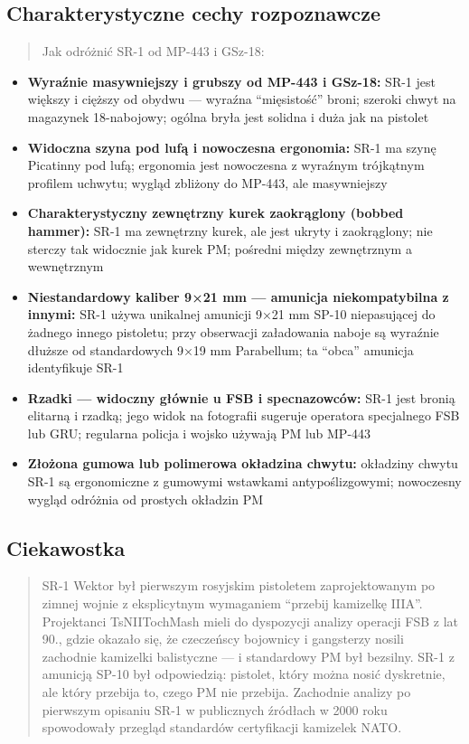 \documentclass[12pt,oneside]{book}
\providecommand{\tightlist}{%
  \setlength{\itemsep}{0pt}\setlength{\parskip}{0pt}}
\begin{document}
\subsection{Charakterystyczne cechy
rozpoznawcze}\label{charakterystyczne-cechy-rozpoznawcze-108}

\begin{quote}
Jak odróżnić SR-1 od MP-443 i GSz-18:
\end{quote}

\begin{itemize}
\tightlist
\item
  \textbf{Wyraźnie masywniejszy i grubszy od MP-443 i GSz-18:} SR-1 jest
  większy i cięższy od obydwu --- wyraźna ``mięsistość'' broni; szeroki
  chwyt na magazynek 18-nabojowy; ogólna bryła jest solidna i duża jak
  na pistolet
\item
  \textbf{Widoczna szyna pod lufą i nowoczesna ergonomia:} SR-1 ma szynę
  Picatinny pod lufą; ergonomia jest nowoczesna z wyraźnym trójkątnym
  profilem uchwytu; wygląd zbliżony do MP-443, ale masywniejszy
\item
  \textbf{Charakterystyczny zewnętrzny kurek zaokrąglony (bobbed
  hammer):} SR-1 ma zewnętrzny kurek, ale jest ukryty i zaokrąglony; nie
  sterczy tak widocznie jak kurek PM; pośredni między zewnętrznym a
  wewnętrznym
\item
  \textbf{Niestandardowy kaliber 9×21 mm --- amunicja niekompatybilna z
  innymi:} SR-1 używa unikalnej amunicji 9×21 mm SP-10 niepasującej do
  żadnego innego pistoletu; przy obserwacji załadowania naboje są
  wyraźnie dłuższe od standardowych 9×19 mm Parabellum; ta ``obca''
  amunicja identyfikuje SR-1
\item
  \textbf{Rzadki --- widoczny głównie u FSB i specnazowców:} SR-1 jest
  bronią elitarną i rzadką; jego widok na fotografii sugeruje operatora
  specjalnego FSB lub GRU; regularna policja i wojsko używają PM lub
  MP-443
\item
  \textbf{Złożona gumowa lub polimerowa okładzina chwytu:} okładziny
  chwytu SR-1 są ergonomiczne z gumowymi wstawkami antypoślizgowymi;
  nowoczesny wygląd odróżnia od prostych okładzin PM
\end{itemize}

\subsection{Ciekawostka}\label{ciekawostka-108}

\begin{quote}
SR-1 Wektor był pierwszym rosyjskim pistoletem zaprojektowanym po zimnej
wojnie z eksplicytnym wymaganiem ``przebij kamizelkę IIIA''. Projektanci
TsNIITochMash mieli do dyspozycji analizy operacji FSB z lat 90., gdzie
okazało się, że czeczeńscy bojownicy i gangsterzy nosili zachodnie
kamizelki balistyczne --- i standardowy PM był bezsilny. SR-1 z amunicją
SP-10 był odpowiedzią: pistolet, który można nosić dyskretnie, ale który
przebija to, czego PM nie przebija. Zachodnie analizy po pierwszym
opisaniu SR-1 w publicznych źródłach w 2000 roku spowodowały przegląd
standardów certyfikacji kamizelek NATO.
\end{quote}
\end{document}
